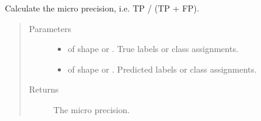 \documentclass[letterpaper,10pt,english]{sphinxmanual}
\begin{document}
\begin{fulllineitems}
\label{\detokenize{pusion.evaluation.evaluation_metrics:pusion.evaluation.evaluation_metrics.micro_precision}}
\sphinxAtStartPar
Calculate the micro precision, i.e. TP / (TP + FP).
\begin{quote}\begin{description}
\item[{Parameters}] \leavevmode\begin{itemize}
\item {} 
\sphinxAtStartPar
{} \textendash{}  of shape  or . True labels or class assignments.

\item {} 
\sphinxAtStartPar
{} \textendash{}  of shape  or . Predicted labels or
class assignments.

\end{itemize}

\item[{Returns}] \leavevmode
\sphinxAtStartPar
The micro precision.

\end{description}\end{quote}

\end{fulllineitems}

\end{document}
